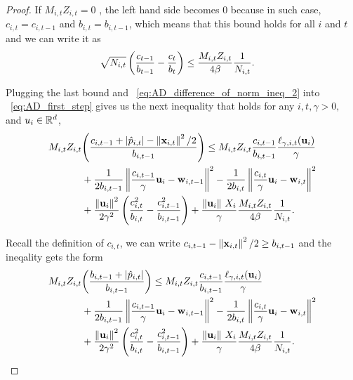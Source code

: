 {\begin{proof}
\noindent
If $M_{i,t}Z_{i,t}=0$ , the left hand side becomes $0$ because in such case, $c_{i,t}=c_{i,t-1}$ and $b_{i,t}=b_{i,t-1}$, which means that this bound holds for all $i$ and $t$ and we can write it as  
\begin{equation*}
\begin{split}
\sqrt{N_{i,t}}\left({\frac{c_{t-1}}{b_{t-1}}-\frac{c_t}{b_t}}\right)
&\le\frac{M_{i,t}Z_{i,t}}{4\beta}\frac{1}{N_{i,t}}.
\end{split}
\end{equation*}

\noindent
Plugging the  last bound and ~\eqref{eq:AD_difference_of_norm_ineq_2} into ~\eqref{eq:AD_first_step} gives 
us the next inequality that holds for any $i,t,\gamma>0,$ and $u_i\in\mathbb{R}^d$,
\begin{equation*}
\begin{split}
M_{i,t}Z_{i,t}&{\left({\frac{c_{i,t-1} +\left\vert{\hat{p}_{i,t}}\right\vert-\left\Vert {\mathbf{x}_{i,t}} \right\Vert^2/2}{b_{i,t-1}}}\right)} \le M_{i,t}Z_{i,t}\frac{c_{i,t-1}}{b_{i,t-1}}\frac{\ell_{\gamma,i,t}(\mathbf{u}_i)}{\gamma}\\
&+\frac{1}{2b_{i,t-1}}\left\Vert {\frac{c_{i,t-1}}{\gamma} \mathbf{u}_i-\mathbf{w}_{i,t-1}} \right\Vert^2-\frac{1}{2b_{i,t}}\left\Vert {\frac{c_{i,t}}{\gamma} \mathbf{u}_i-\mathbf{w}_{i,t}} \right\Vert^2\\
&+\frac{\left\Vert {\mathbf{u}_i} \right\Vert^2}{2\gamma^2}\left({\frac{c_{i,t}^2}{b_{i,t}}-\frac{c_{i,t-1}^2}{b_{i,t-1}}}\right)+
\frac{\Vert\mathbf{u}_i\Vert~ X_i}{\gamma}\frac{M_{i,t}Z_{i,t}}{4\beta}\frac{1}{N_{i,t}}.
\end{split}
\end{equation*}

\noindent
Recall the definition of $c_{i,t}$, we can write $c_{i,t-1}-\left\Vert {\mathbf{x}_{i,t}} \right\Vert^2/2\ge b_{i,t-1}$ and the ineqality gets the form
\begin{equation*}
\begin{split}
M_{i,t}Z_{i,t}&{\left({\frac{b_{i,t-1} +\left\vert{\hat{p}_{i,t}}\right\vert}{b_{i,t-1}}}\right)} \le M_{i,t}Z_{i,t}\frac{c_{i,t-1}}{b_{i,t-1}}\frac{\ell_{\gamma,i,t}(\mathbf{u}_i)}{\gamma}\\
&+\frac{1}{2b_{i,t-1}}\left\Vert {\frac{c_{i,t-1}}{\gamma} \mathbf{u}_i-\mathbf{w}_{i,t-1}} \right\Vert^2-\frac{1}{2b_{i,t}}\left\Vert {\frac{c_{i,t}}{\gamma} \mathbf{u}_i-\mathbf{w}_{i,t}} \right\Vert^2\\
&+\frac{\left\Vert {\mathbf{u}_i} \right\Vert^2}{2\gamma^2}\left({\frac{c_{i,t}^2}{b_{i,t}}-\frac{c_{i,t-1}^2}{b_{i,t-1}}}\right)+
\frac{\Vert\mathbf{u}_i\Vert~ X_i}{\gamma}\frac{M_{i,t}Z_{i,t}}{4\beta}\frac{1}{N_{i,t}}.
\end{split}
\end{equation*}


\end{proof}}
